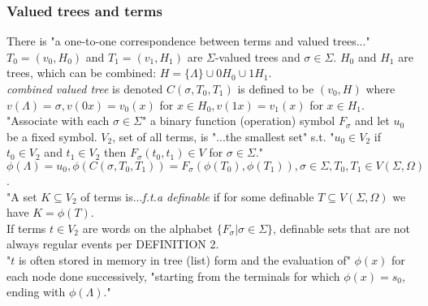 \subsubsection{Valued trees and terms}
There is "a one-to-one correspondence between terms and valued trees..."\\
$T_0 = (v_0, H_0)$ and $T_1 = (v_1, H_1)$ are $\Sigma$-valued trees and $\sigma \in \Sigma$.  $H_0$ and $H_1$ are trees, which can be combined: $H = \{ \Lambda \} \cup 0H_0 \cup 1H_1$.\\
\textit{combined valued tree} is denoted $C(\sigma, T_0, T_1)$ is defined to be $(v_0, H)$ where $v(\Lambda) = \sigma, v(0x) = v_0(x)$ for $x \in H_0, v(1x) = v_1(x)$ for $x \in H_1$.\\
"Associate with each $\sigma \in \Sigma$" a binary function (operation) symbol $F_\sigma$ and let $u_0$ be a fixed symbol.  $V_2$, set of all terms, is "...the
 smallest set" s.t. "$u_0 \in V_2$ if $t_0 \in V_2$ and $t_1 \in V_2$ then $F_\sigma(t_0, t_1) \in V$ for $\sigma \in \Sigma$."\\
 $\phi(\Lambda) =  u_0, \phi(C(\sigma, T_0, T_1)) = F_\sigma(\phi(T_0), \phi(T_1)), \sigma \in \Sigma, T_0, T_1 \in V(\Sigma, \Omega)$.\\
"A set $K \subseteq V_2$ of terms is...\textit{f.t.a definable} if for some definable $T \subseteq V(\Sigma, \Omega)$ we have $K = \phi(T)$.\\
If terms $t \in V_2$ are words on the alphabet $\{ F_{\sigma} | \sigma \in \Sigma \}$, definable sets that are not always regular events per DEFINITION 2.\\
"$t$ is often stored in memory in tree (list) form and the evaluation of" $\phi(x)$ for each node done successively, "starting from the terminals for which $\phi(x) = s_0$, ending with $\phi(\Lambda)$."